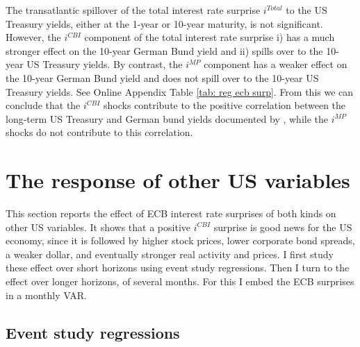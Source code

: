 \documentclass[a4paper,12pt]{article}
\begin{document}
The transatlantic spillover of the total interest rate surprise $i^{Total}$ to the US Treasury yields, either at the 1-year or 10-year maturity, is not significant. However, the $i^{CBI}$ component of the total interest rate surprise
i) has a much stronger effect on the 10-year German Bund yield and ii) spills over to the 10-year US Treasury yields. By contrast, the $i^{MP}$ component has a weaker effect on the 10-year German Bund yield and does not spill over to the 10-year US Treasury yields.
See Online Appendix Table \ref{tab: reg ecb surp}.
From this we can conclude that the $i^{CBI}$ shocks contribute to the positive correlation between the long-term US Treasury and German bund yields documented by \cite{Curcuru_etal_2018}, while the $i^{MP}$ shocks do not contribute to this correlation.


\section{The response of other US variables}

This section reports the effect of ECB interest rate surprises of both kinds on other US variables.
It shows that a positive  $i^{CBI}$  surprise is good news for the US economy, since
it is followed by higher stock prices, lower corporate bond spreads, a weaker dollar,
and eventually stronger real activity and prices. 
I first study these effect over short horizons using event study regressions.
Then I turn to the effect over longer horizons, of several months. For this I embed the ECB surprises in a monthly VAR.


\subsection{Event study regressions}
\end{document}
